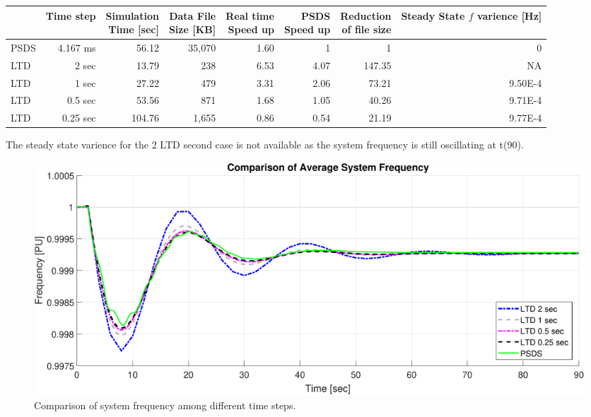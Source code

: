 \documentclass[12pt]{article}
\begin{document}
\begin{table}[!ht]
	\centering
	\begin{tabular}{@{} lrrrrrrr @{}} 	
		\toprule %
		\footnotesize %
		  & Time step  & \shortstack{Simulation\\ Time [sec] } & \shortstack{Data File \\Size [KB] }  & \shortstack{Real time \\Speed up}& \shortstack{ PSDS\\Speed up} & \shortstack{Reduction \\ of file size}  & \shortstack{Steady State $f$ \\ varience [Hz]}\\
		\midrule		
		PSDS	& 4.167 ms &  56.12   & 35,070 & 1.60& 1 & 1 & 0\\
		LTD		&	2 sec	& 13.79   &	238 &6.53&4.07 & 147.35 & NA \\ %
		LTD		&	1 sec	& 27.22   &	479 &3.31&2.06 & 73.21& 9.50E-4\\ %
		LTD		&	0.5 sec	& 53.56   &	871 &1.68&1.05 & 40.26 & 9.71E-4\\ %
		LTD		&	0.25 sec	& 104.76   &	1,655 &0.86&0.54 & 21.19& 9.77E-4\\ %
		\bottomrule
	\end{tabular}
\end{table} 

The steady state varience for the 2 LTD second case is not available as the system frequency is still oscillating at t(90).

	\begin{figure}[h!]
			\centering
			\includegraphics[width=\linewidth]{tsComp}\vspace{-1em}
			\caption{Comparison of system frequency among different time steps.}
			\label{tsComp}		 
	\end{figure}\vspace{-.5em}
\end{document}
